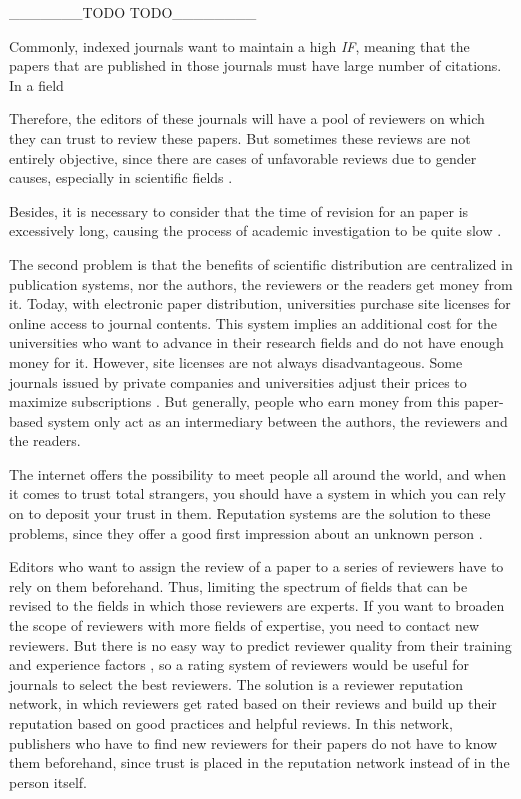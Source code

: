 _______TODO TODO________

Commonly, indexed journals want to maintain a high \emph{IF}, meaning that the
papers that are published in those journals must have large number of citations.
In a field


Therefore, the editors of these journals will have a pool of reviewers on which
they can trust to review these papers. But sometimes these reviews are not
entirely objective, since there are cases of unfavorable reviews due to gender
causes, especially in scientific fields \cite{wenneras2001nepotism}.

Besides, it is necessary to consider that the time of revision for an paper is
excessively long, causing the process of academic investigation to be quite slow
\cite{huisman2017duration}.

The second problem is that the benefits of scientific distribution are
centralized in publication systems, nor the authors, the reviewers or the
readers get money from it. Today, with electronic paper distribution,
universities purchase site licenses for online access to journal contents. This
system implies an additional cost for the universities who want to advance in
their research fields and do not have enough money for it. However, site
licenses are not always disadvantageous. Some journals issued by private
companies and universities adjust their prices to maximize subscriptions
\cite{bergstrom2004costs}. But generally, people who earn money from this
paper-based system only act as an intermediary between the authors, the
reviewers and the readers.

The internet offers the possibility to meet people all around the world, and
when it comes to trust total strangers, you should have a system in which you
can rely on to deposit your trust in them. Reputation systems are the solution
to these problems, since they offer a good first impression about an unknown
person \cite{resnick2000reputation}.

Editors who want to assign the review of a paper to a series of reviewers have
to rely on them beforehand. Thus, limiting the spectrum of fields that can be
revised to the fields in which those reviewers are experts. If you want to
broaden the scope of reviewers with more fields of expertise, you need to
contact new reviewers. But there is no easy way to predict reviewer quality from
their training and experience factors \cite{callaham_relationship_2007}, so a
rating system of reviewers would be useful for journals to select the best
reviewers. The solution is a reviewer reputation network, in which reviewers get
rated based on their reviews and build up their reputation based on good
practices and helpful reviews. In this network, publishers who have to find new
reviewers for their papers do not have to know them beforehand, since trust is
placed in the reputation network instead of in the person itself.


